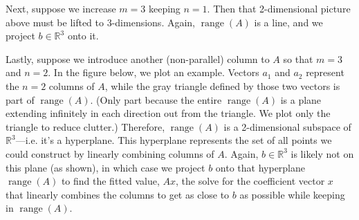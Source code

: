\documentclass[12pt]{article}
\numberwithin{equation}{section} %
\theoremstyle{plain}
\theoremstyle{definition}
\theoremstyle{remark}
\newcommand{\R}{\mathbb{R}}
\newcommand{\range}{\operatorname{range}}
\begin{document}
Next, suppose we increase $m=3$ keeping $n=1$. Then that 2-dimensional
picture above must be lifted to 3-dimensions. Again, $\range(A)$ is a
line, and we project $b\in\R^3$ onto it.

Lastly, suppose we introduce another (non-parallel) column to $A$ so
that $m=3$ and $n=2$. In the figure below, we plot an example.
Vectors $a_1$ and $a_2$ represent the $n=2$ columns of $A$, while the
gray triangle defined by those two vectors is part of $\range(A)$.
(Only part because the entire $\range(A)$ is a plane extending
infinitely in each direction out from the triangle. We plot only the
triangle to reduce clutter.)
Therefore, $\range(A)$ is a 2-dimensional subspace of $\R^3$---i.e. it's
a hyperplane. This hyperplane represents the set of all points we could
construct by linearly combining columns of $A$.  Again, $b\in\R^3$ is
likely not on this plane (as shown), in which case we project $b$ onto
that hyperplane $\range(A)$ to find the fitted value, $Ax$, the solve
for the coefficient vector $x$ that linearly combines the columns to get
as close to $b$ as possible while keeping in $\range(A)$.

\begin{figure}[htbp!]
\centering
{}
\end{figure}
\end{document}
